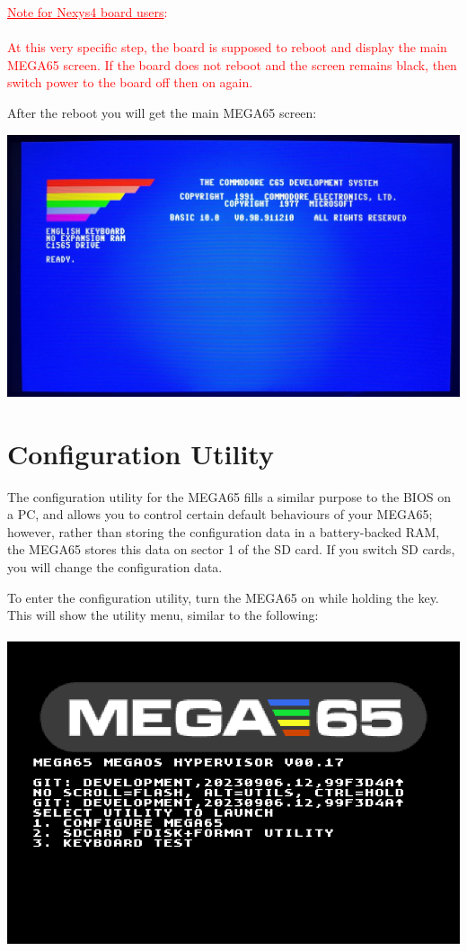\textcolor{red}{\underline{Note for Nexys4 board users}: \\
\\
  At this very specific step, the board is supposed to reboot and display the main MEGA65 screen. If the board does not reboot and the screen remains black, then switch power to the board off then on again.}

After the reboot you will get the main MEGA65 screen:

\begin{center}
  \includegraphics[width=\linewidth]{images/img011_final_boot_06.jpg}
\end{center}

\section{Configuration Utility}

The configuration utility for the MEGA65 fills a similar purpose to the BIOS on a PC, and allows you to control certain default behaviours of your MEGA65; however, rather than storing the configuration data in a
battery-backed RAM, the MEGA65 stores this data on sector 1 of the SD card. If you switch SD cards, you will change the configuration data.


\begin{minipage}{\linewidth}
  To enter the configuration utility, turn the MEGA65 on while
  holding the  key.  This will show the utility menu,
  similar to the following: \\
  \\
  \includegraphics[width=\linewidth]{images/ss-utilmenu.png}
\end{minipage}

